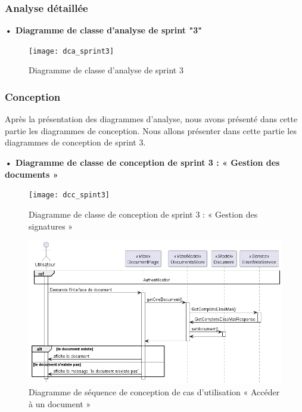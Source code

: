 \subsubsection{Analyse détaillée}
\textbf{•	Diagramme de classe d'analyse de sprint "3" }

\begin{figure}[H]
  \centering
  \texttt{[image: dca\_sprint3]}
  \caption{Diagramme de classe d'analyse de sprint 3}
  \label{fig:class_analyse_signatures3}
\end{figure}


\subsubsection{Conception}

Après la présentation des diagrammes d'analyse, nous avons présenté dans cette partie les diagrammes de conception.
Nous allons présenter dans cette partie les diagrammes de conception de sprint 3.
\newpage 
\begin{landscape}

\textbf{•	Diagramme de classe de conception de sprint 3 : « Gestion des documents »}

\begin{figure}[H]
  \centering
  \texttt{[image: dcc\_spint3]}
  \caption{Diagramme de classe de conception de sprint 3 : « Gestion des signatures »}
  \label{fig:class_diagram_signatures3}
\end{figure}
\end{landscape}
\newpage
\begin{figure}[H]
  \centering
  \includegraphics[width=1\textwidth]{out/diagrams/documents/sequence_preview/sequence_preview}
  \caption{Diagramme de séquence de conception de cas d'utilisation « Accéder à un document »}
  \label{fig:sequence_conception_preview_document}
\end{figure}
